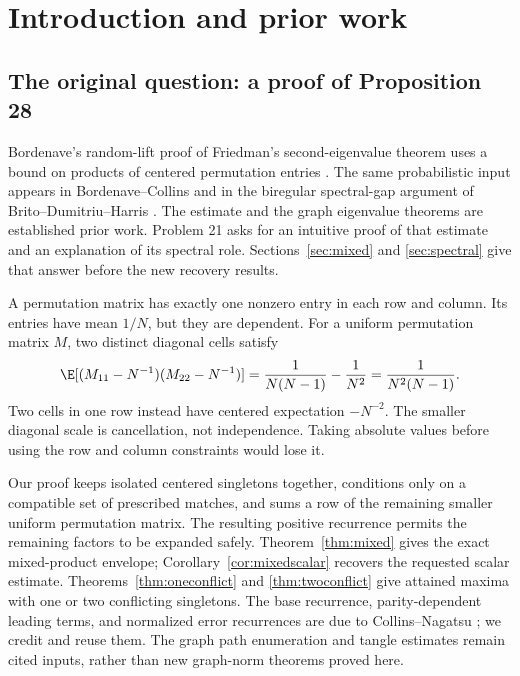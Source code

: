 \section{Introduction and prior work}\label{sec:report-introduction}
\subsection{The original question: a proof of Proposition 28}
Bordenave's random-lift proof of Friedman's second-eigenvalue theorem
uses a bound on products of centered permutation entries
\cite[Proposition 28]{Bordenave}. The same probabilistic input appears in
Bordenave--Collins \cite[Proposition 22]{BC} and in the biregular
spectral-gap argument of Brito--Dumitriu--Harris \cite[Lemma 5.6]{BDH}.
The estimate and the graph eigenvalue theorems are established prior
work. Problem 21 asks for an intuitive proof of that estimate and an
explanation of its spectral role. Sections~\ref{sec:mixed} and
\ref{sec:spectral} give that answer before the new recovery results.

A permutation matrix has exactly one nonzero entry in each row and
column. Its entries have mean $1/N$, but they are dependent. For a
uniform permutation matrix $M$, two distinct diagonal cells satisfy
\begin{equation}\label{eq:two}
\E[(M_{11}-N^{-1})(M_{22}-N^{-1})]
=\frac{1}{N(N-1)}-\frac1{N^2}
=\frac{1}{N^2(N-1)}.
\end{equation}
Two cells in one row instead have centered expectation $-N^{-2}$.
The smaller diagonal scale is cancellation, not independence. Taking
absolute values before using the row and column constraints would lose it.

Our proof keeps isolated centered singletons together, conditions only
on a compatible set of prescribed matches, and sums a row of the
remaining smaller uniform permutation matrix. The resulting positive
recurrence permits the remaining factors to be expanded safely.
Theorem~\ref{thm:mixed} gives the exact mixed-product envelope;
Corollary~\ref{cor:mixedscalar} recovers the requested scalar estimate.
Theorems~\ref{thm:oneconflict} and \ref{thm:twoconflict} give attained
maxima with one or two conflicting singletons. The base recurrence,
parity-dependent leading terms, and normalized error recurrences are due
to Collins--Nagatsu \cite[Proposition 3.3]{CN}; we credit and reuse them.
The graph path enumeration and tangle estimates remain cited inputs,
rather than new graph-norm theorems proved here.

